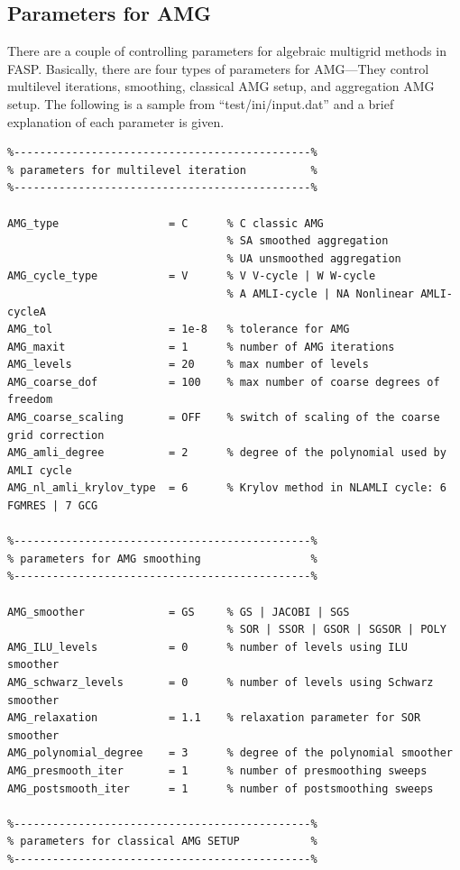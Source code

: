 \documentclass[11pt]{memoir}
\begin{document}
\subsection{Parameters for AMG}

There are a couple of controlling parameters for algebraic multigrid methods in FASP. Basically, there are four types of parameters for AMG---They control multilevel iterations, smoothing, classical AMG setup, and aggregation AMG setup. The following is a sample from ``test/ini/input.dat'' and a brief explanation of each parameter is given.

\begin{lstlisting}
%----------------------------------------------%
% parameters for multilevel iteration          %
%----------------------------------------------%

AMG_type                 = C      % C classic AMG
                                  % SA smoothed aggregation
                                  % UA unsmoothed aggregation
AMG_cycle_type           = V      % V V-cycle | W W-cycle
                                  % A AMLI-cycle | NA Nonlinear AMLI-cycleA
AMG_tol                  = 1e-8   % tolerance for AMG
AMG_maxit                = 1      % number of AMG iterations
AMG_levels               = 20     % max number of levels
AMG_coarse_dof           = 100    % max number of coarse degrees of freedom
AMG_coarse_scaling       = OFF    % switch of scaling of the coarse grid correction
AMG_amli_degree          = 2      % degree of the polynomial used by AMLI cycle
AMG_nl_amli_krylov_type  = 6      % Krylov method in NLAMLI cycle: 6 FGMRES | 7 GCG

%----------------------------------------------%
% parameters for AMG smoothing                 %
%----------------------------------------------%

AMG_smoother             = GS     % GS | JACOBI | SGS
                                  % SOR | SSOR | GSOR | SGSOR | POLY
AMG_ILU_levels           = 0      % number of levels using ILU smoother
AMG_schwarz_levels       = 0      % number of levels using Schwarz smoother
AMG_relaxation           = 1.1    % relaxation parameter for SOR smoother
AMG_polynomial_degree    = 3      % degree of the polynomial smoother
AMG_presmooth_iter       = 1      % number of presmoothing sweeps
AMG_postsmooth_iter      = 1      % number of postsmoothing sweeps

%----------------------------------------------%
% parameters for classical AMG SETUP           %
%----------------------------------------------%


\end{lstlisting}
\end{document}
